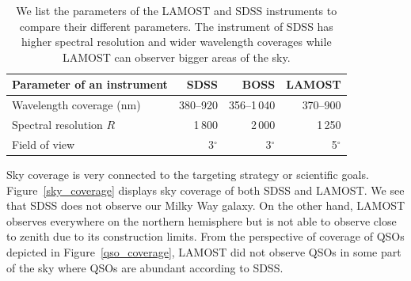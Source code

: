 \begin{table}
\begin{center}
\begin{tabular}{|l|r|r|r|}
	\hline
	Parameter of an instrument & SDSS & BOSS & LAMOST \\
	\hline \hline
	Wavelength coverage (nm) & 380--920 & 356--1\,040 & 370--900 \\
	\hline
	Spectral resolution \(R\) & 1\,800 & 2\,000 & 1\,250 \\
	\hline
	Field of view & 3\(^{\circ}\) & 3\(^{\circ}\) & 5\(^{\circ}\) \\
	\hline
\end{tabular}
\end{center}
\caption[Parameters of the LAMOST and SDSS instruments]{
	We list the parameters of the LAMOST and SDSS instruments
	to compare their different parameters.
	The instrument of SDSS has higher spectral resolution and wider wavelength coverages
	while LAMOST can observer bigger areas of the sky.
	}
\label{telescopes_parameters}
\end{table}

Sky coverage is very connected to the targeting strategy or scientific goals.
Figure~\ref{sky_coverage} displays sky coverage of both SDSS and LAMOST.
We see that SDSS does not observe our Milky Way galaxy.
On the other hand, LAMOST observes everywhere on the northern hemisphere
but is not able to observe close to zenith due to its construction limits.
From the perspective of coverage of QSOs depicted in Figure~\ref{qso_coverage},
LAMOST did not observe QSOs in some part of the sky where QSOs are abundant according to SDSS.

